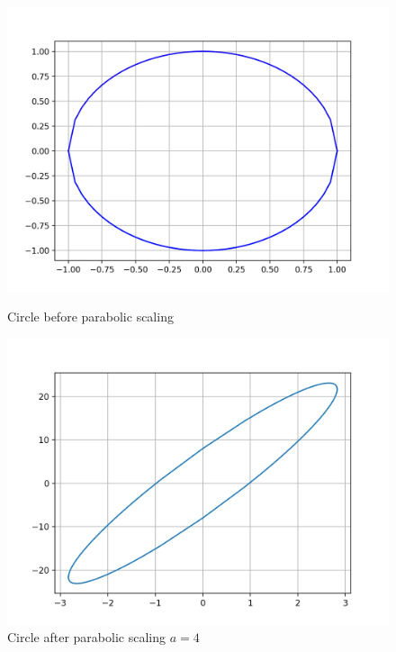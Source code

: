 \begin{figure}[!tbp]
  \centering
  \begin{minipage}[b]{0.45\textwidth}
    \includegraphics[width=\textwidth]{./Diagrams/circle.png}
    \caption{Circle before parabolic scaling}
  \end{minipage}
  \hfill
  \begin{minipage}[b]{0.45\textwidth}
    \includegraphics[width=\textwidth]{./Diagrams/circle_scaled.png}
    \caption{Circle after parabolic scaling $a=4$}
  \end{minipage}
\end{figure}


